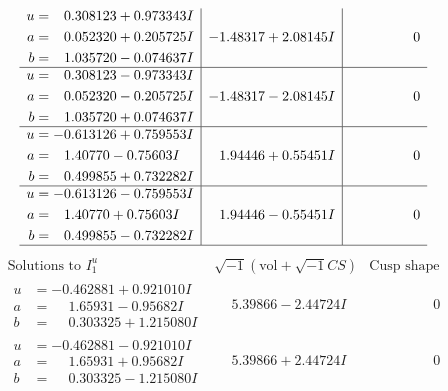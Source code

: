 \documentclass[1p]{elsarticle_modified}
\theoremstyle{definition}
\newcommand{\I}{\sqrt{-1}}
\begin{document}
$$\begin{array}{c|c|c}
\begin{aligned}
u &= \phantom{-}0.308123 + 0.973343 I \\
a &= \phantom{-}0.052320 + 0.205725 I \\
b &= \phantom{-}1.035720 - 0.074637 I\end{aligned}
 & -1.48317 + 2.08145 I & \phantom{-0.000000 } 0 \\ \hline\begin{aligned}
u &= \phantom{-}0.308123 - 0.973343 I \\
a &= \phantom{-}0.052320 - 0.205725 I \\
b &= \phantom{-}1.035720 + 0.074637 I\end{aligned}
 & -1.48317 - 2.08145 I & \phantom{-0.000000 } 0 \\ \hline\begin{aligned}
u &= -0.613126 + 0.759553 I \\
a &= \phantom{-}1.40770 - 0.75603 I \\
b &= \phantom{-}0.499855 + 0.732282 I\end{aligned}
 & \phantom{-}1.94446 + 0.55451 I & \phantom{-0.000000 } 0 \\ \hline\begin{aligned}
u &= -0.613126 - 0.759553 I \\
a &= \phantom{-}1.40770 + 0.75603 I \\
b &= \phantom{-}0.499855 - 0.732282 I\end{aligned}
 & \phantom{-}1.94446 - 0.55451 I & \phantom{-0.000000 } 0\\
 \hline 
 \end{array}$$\newpage$$\begin{array}{c|c|c}  
\text{Solutions to }I^u_{1}& \I (\text{vol} + \sqrt{-1}CS) & \text{Cusp shape}\\
 \hline 
\begin{aligned}
u &= -0.462881 + 0.921010 I \\
a &= \phantom{-}1.65931 - 0.95682 I \\
b &= \phantom{-}0.303325 + 1.215080 I\end{aligned}
 & \phantom{-}5.39866 - 2.44724 I & \phantom{-0.000000 } 0 \\ \hline\begin{aligned}
u &= -0.462881 - 0.921010 I \\
a &= \phantom{-}1.65931 + 0.95682 I \\
b &= \phantom{-}0.303325 - 1.215080 I\end{aligned}
 & \phantom{-}5.39866 + 2.44724 I & \phantom{-0.000000 } 0 \\ \hline\begin{aligned}

\end{aligned}
\end{array}$$
\end{document}
